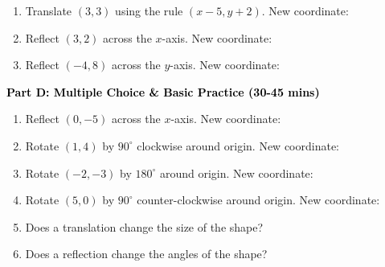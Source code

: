 \documentclass[12pt, letterpaper, fleqn]{article}
\newcommand{\blank}{\underline{\hspace{2.2cm}}}
\begin{document}
\vspace{3mm}

\begin{enumerate}[itemsep=2.5cm, leftmargin=0.6cm, resume]
\item Translate $(3, 3)$ using the rule $(x-5, y+2)$. New coordinate: \blank
\item Reflect $(3, 2)$ across the $x$-axis. New coordinate: \blank
\item Reflect $(-4, 8)$ across the $y$-axis. New coordinate: \blank
\end{enumerate}

\newpage

\begin{tcolorbox}[colback=customteal!20]
\large\textcolor{black}{\textbf{Part D: Multiple Choice \& Basic Practice (30-45 mins)}}
\end{tcolorbox}

\vspace{3mm}

\begin{enumerate}[itemsep=2.5cm, leftmargin=0.6cm, resume]
\item Reflect $(0, -5)$ across the $x$-axis. New coordinate: \blank
\item Rotate $(1, 4)$ by $90^\circ$ clockwise around origin. New coordinate: \blank
\item Rotate $(-2, -3)$ by $180^\circ$ around origin. New coordinate: \blank
\item Rotate $(5, 0)$ by $90^\circ$ counter-clockwise around origin. New coordinate: \blank
\item Does a translation change the size of the shape? \blank
\item Does a reflection change the angles of the shape? \blank
\end{enumerate}
\end{document}
